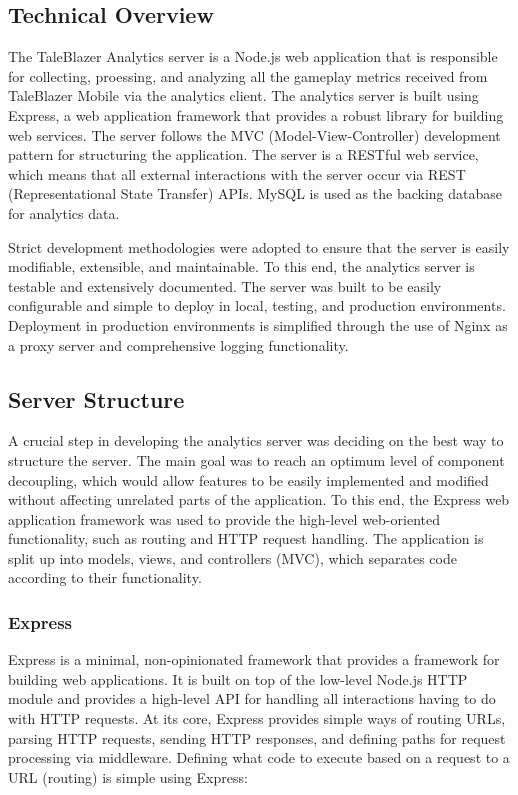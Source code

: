 \subsection{Technical Overview}

The TaleBlazer Analytics server is a Node.js web application that is responsible for collecting, proessing, and analyzing all the gameplay metrics received from TaleBlazer Mobile via the analytics client. The analytics server is built using Express, a web application framework that provides a robust library for building web services. The server follows the MVC (Model-View-Controller) development pattern for structuring the application. The server is a RESTful web service, which means that all external interactions with the server occur via REST (Representational State Transfer) APIs. \cite{site:rest} MySQL is used as the backing database for analytics data.

Strict development methodologies were adopted to ensure that the server is easily modifiable, extensible, and maintainable. To this end, the analytics server is testable and extensively documented. The server was built to be easily configurable and simple to deploy in local, testing, and production environments. Deployment in production environments is simplified through the use of Nginx as a proxy server and comprehensive logging functionality.

\subsection{Server Structure}

A crucial step in developing the analytics server was deciding on the best way to structure the server. The main goal was to reach an optimum level of component decoupling, which would allow features to be easily implemented and modified without affecting unrelated parts of the application. To this end, the Express web application framework was used to provide the high-level web-oriented functionality, such as routing and HTTP request handling. The application is split up into models, views, and controllers (MVC), which separates code according to their functionality. 

\subsubsection{Express}
Express is a minimal, non-opinionated framework that provides a framework for building web applications. It is built on top of the low-level Node.js HTTP module and provides a high-level API for handling all interactions having to do with HTTP requests. At its core, Express provides simple ways of routing URLs, parsing HTTP requests, sending HTTP responses, and defining paths for request processing via middleware. Defining what code to execute based on a request to a URL (routing) is simple using Express:

